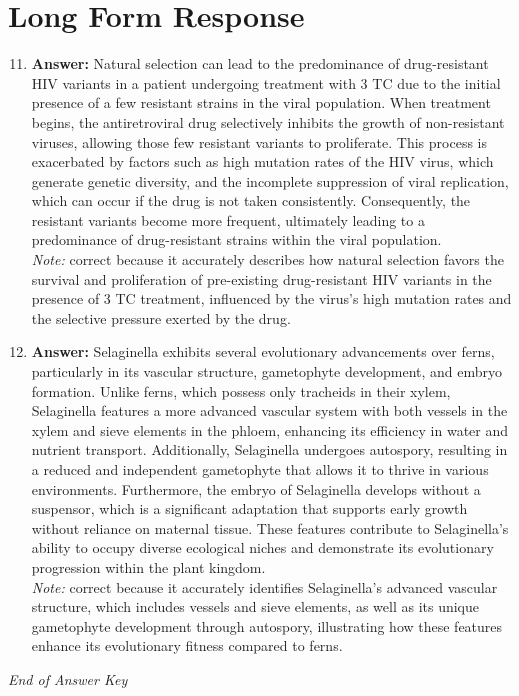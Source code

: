 \documentclass[12pt]{article}
\begin{document}
\section*{Long Form Response}
\begin{enumerate}[label=\arabic*.]
\setcounter{enumi}{10}
\item \textbf{Answer:} Natural selection can lead to the predominance of drug-resistant HIV variants in a patient undergoing treatment with 3 TC due to the initial presence of a few resistant strains in the viral population. When treatment begins, the antiretroviral drug selectively inhibits the growth of non-resistant viruses, allowing those few resistant variants to proliferate. This process is exacerbated by factors such as high mutation rates of the HIV virus, which generate genetic diversity, and the incomplete suppression of viral replication, which can occur if the drug is not taken consistently. Consequently, the resistant variants become more frequent, ultimately leading to a predominance of drug-resistant strains within the viral population.
\\ \textit{Note:} correct because it accurately describes how natural selection favors the survival and proliferation of pre-existing drug-resistant HIV variants in the presence of 3 TC treatment, influenced by the virus's high mutation rates and the selective pressure exerted by the drug.
\item \textbf{Answer:} Selaginella exhibits several evolutionary advancements over ferns, particularly in its vascular structure, gametophyte development, and embryo formation. Unlike ferns, which possess only tracheids in their xylem, Selaginella features a more advanced vascular system with both vessels in the xylem and sieve elements in the phloem, enhancing its efficiency in water and nutrient transport. Additionally, Selaginella undergoes autospory, resulting in a reduced and independent gametophyte that allows it to thrive in various environments. Furthermore, the embryo of Selaginella develops without a suspensor, which is a significant adaptation that supports early growth without reliance on maternal tissue. These features contribute to Selaginella's ability to occupy diverse ecological niches and demonstrate its evolutionary progression within the plant kingdom.
\\ \textit{Note:} correct because it accurately identifies Selaginella's advanced vascular structure, which includes vessels and sieve elements, as well as its unique gametophyte development through autospory, illustrating how these features enhance its evolutionary fitness compared to ferns.
\end{enumerate}

\vfill
\noindent\textit{End of Answer Key}
\end{document}
